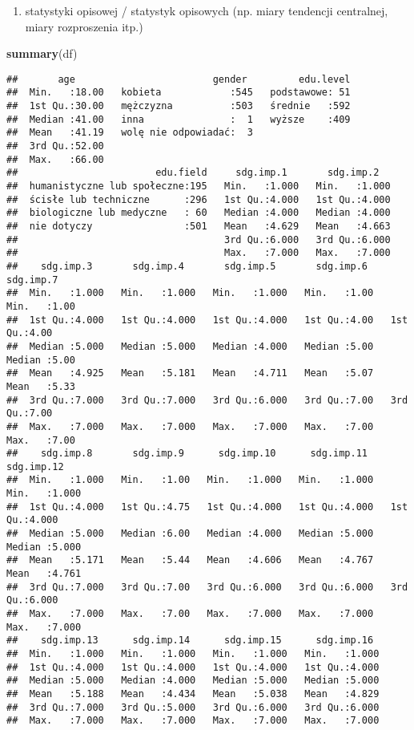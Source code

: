 \documentclass[
]{article}
\newenvironment{Shaded}{\begin{snugshade}}{\end{snugshade}}
\newcommand{\FunctionTok}[1]{\textcolor[rgb]{0.13,0.29,0.53}{\textbf{#1}}}
\newcommand{\NormalTok}[1]{#1}
\providecommand{\tightlist}{%
  \setlength{\itemsep}{0pt}\setlength{\parskip}{0pt}}
\begin{document}
\begin{enumerate}
\def\labelenumi{\arabic{enumi})}
\tightlist
\item
  statystyki opisowej / statystyk opisowych (np. miary tendencji
  centralnej, miary rozproszenia itp.)
\end{enumerate}

\begin{Shaded}
\begin{Highlighting}[]
\FunctionTok{summary}\NormalTok{(df)}
\end{Highlighting}
\end{Shaded}

\begin{verbatim}
##       age                        gender         edu.level  
##  Min.   :18.00   kobieta            :545   podstawowe: 51  
##  1st Qu.:30.00   mężczyzna          :503   średnie   :592  
##  Median :41.00   inna               :  1   wyższe    :409  
##  Mean   :41.19   wolę nie odpowiadać:  3                   
##  3rd Qu.:52.00                                             
##  Max.   :66.00                                             
##                        edu.field     sdg.imp.1       sdg.imp.2    
##  humanistyczne lub społeczne:195   Min.   :1.000   Min.   :1.000  
##  ścisłe lub techniczne      :296   1st Qu.:4.000   1st Qu.:4.000  
##  biologiczne lub medyczne   : 60   Median :4.000   Median :4.000  
##  nie dotyczy                :501   Mean   :4.629   Mean   :4.663  
##                                    3rd Qu.:6.000   3rd Qu.:6.000  
##                                    Max.   :7.000   Max.   :7.000  
##    sdg.imp.3       sdg.imp.4       sdg.imp.5       sdg.imp.6      sdg.imp.7   
##  Min.   :1.000   Min.   :1.000   Min.   :1.000   Min.   :1.00   Min.   :1.00  
##  1st Qu.:4.000   1st Qu.:4.000   1st Qu.:4.000   1st Qu.:4.00   1st Qu.:4.00  
##  Median :5.000   Median :5.000   Median :4.000   Median :5.00   Median :5.00  
##  Mean   :4.925   Mean   :5.181   Mean   :4.711   Mean   :5.07   Mean   :5.33  
##  3rd Qu.:7.000   3rd Qu.:7.000   3rd Qu.:6.000   3rd Qu.:7.00   3rd Qu.:7.00  
##  Max.   :7.000   Max.   :7.000   Max.   :7.000   Max.   :7.00   Max.   :7.00  
##    sdg.imp.8       sdg.imp.9      sdg.imp.10      sdg.imp.11      sdg.imp.12   
##  Min.   :1.000   Min.   :1.00   Min.   :1.000   Min.   :1.000   Min.   :1.000  
##  1st Qu.:4.000   1st Qu.:4.75   1st Qu.:4.000   1st Qu.:4.000   1st Qu.:4.000  
##  Median :5.000   Median :6.00   Median :4.000   Median :5.000   Median :5.000  
##  Mean   :5.171   Mean   :5.44   Mean   :4.606   Mean   :4.767   Mean   :4.761  
##  3rd Qu.:7.000   3rd Qu.:7.00   3rd Qu.:6.000   3rd Qu.:6.000   3rd Qu.:6.000  
##  Max.   :7.000   Max.   :7.00   Max.   :7.000   Max.   :7.000   Max.   :7.000  
##    sdg.imp.13      sdg.imp.14      sdg.imp.15      sdg.imp.16   
##  Min.   :1.000   Min.   :1.000   Min.   :1.000   Min.   :1.000  
##  1st Qu.:4.000   1st Qu.:4.000   1st Qu.:4.000   1st Qu.:4.000  
##  Median :5.000   Median :4.000   Median :5.000   Median :5.000  
##  Mean   :5.188   Mean   :4.434   Mean   :5.038   Mean   :4.829  
##  3rd Qu.:7.000   3rd Qu.:5.000   3rd Qu.:6.000   3rd Qu.:6.000  
##  Max.   :7.000   Max.   :7.000   Max.   :7.000   Max.   :7.000
\end{verbatim}
\end{document}
